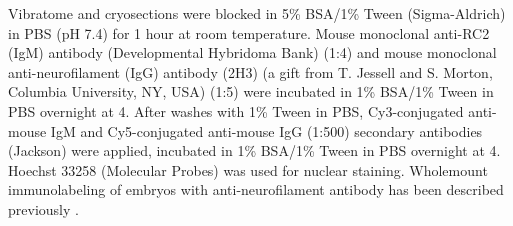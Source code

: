 Vibratome and cryosections were blocked in 5\% BSA/1\% Tween (Sigma-Aldrich) in PBS (pH 7.4) for 1 hour at room temperature.
Mouse monoclonal anti-RC2 (IgM) antibody (Developmental Hybridoma Bank) (1:4) and mouse monoclonal anti-neurofilament (IgG) antibody (2H3) (a gift from T. Jessell and S. Morton, Columbia University, NY, USA) (1:5) were incubated in 1\% BSA/1\% Tween in PBS overnight at 4\textcelsius.
After washes with 1\% Tween in PBS, Cy3-conjugated anti-mouse IgM and Cy5-conjugated anti-mouse IgG (1:500) secondary antibodies (Jackson) were applied, incubated in 1\% BSA/1\% Tween in PBS overnight at 4\textcelsius.
Hoechst 33258 (Molecular Probes) was used for nuclear staining.
Wholemount immunolabeling of embryos with anti-neurofilament antibody has been described previously \cite{huber2005distinct}.